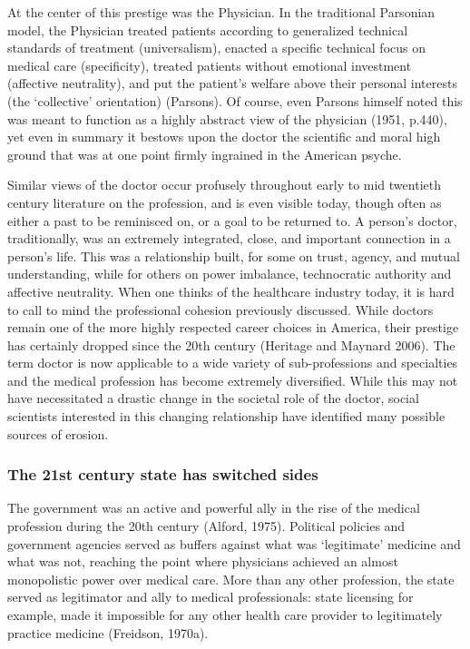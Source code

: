 \documentclass[12pt,twoside]{reedthesis}
\begin{document}
  At the center of this prestige was the Physician. In the traditional
  Parsonian model, the Physician treated patients according to generalized
  technical standards of treatment (universalism), enacted a specific
  technical focus on medical care (specificity), treated patients without
  emotional investment (affective neutrality), and put the patient's
  welfare above their personal interests (the `collective' orientation)
  (Parsons). Of course, even Parsons himself noted this was meant to
  function as a highly abstract view of the physician (1951, p.440), yet
  even in summary it bestows upon the doctor the scientific and moral high
  ground that was at one point firmly ingrained in the American psyche.
  
  Similar views of the doctor occur profusely throughout early to mid
  twentieth century literature on the profession, and is even visible
  today, though often as either a past to be reminisced on, or a goal to
  be returned to. A person's doctor, traditionally, was an extremely
  integrated, close, and important connection in a person's life. This was
  a relationship built, for some on trust, agency, and mutual
  understanding, while for others on power imbalance, technocratic
  authority and affective neutrality. When one thinks of the healthcare
  industry today, it is hard to call to mind the professional cohesion
  previously discussed. While doctors remain one of the more highly
  respected career choices in America, their prestige has certainly
  dropped since the 20th century (Heritage and Maynard 2006). The term
  doctor is now applicable to a wide variety of sub-professions and
  specialties and the medical profession has become extremely diversified.
  While this may not have necessitated a drastic change in the societal
  role of the doctor, social scientists interested in this changing
  relationship have identified many possible sources of erosion.
  
  \subsubsection*{The 21st century state has switched
  sides}\label{the-21st-century-state-has-switched-sides}
  
  The government was an active and powerful ally in the rise of the
  medical profession during the 20th century (Alford, 1975). Political
  policies and government agencies served as buffers against what was
  `legitimate' medicine and what was not, reaching the point where
  physicians achieved an almost monopolistic power over medical care. More
  than any other profession, the state served as legitimator and ally to
  medical professionals: state licensing for example, made it impossible
  for any other health care provider to legitimately practice medicine
  (Freidson, 1970a).
  
\end{document}
